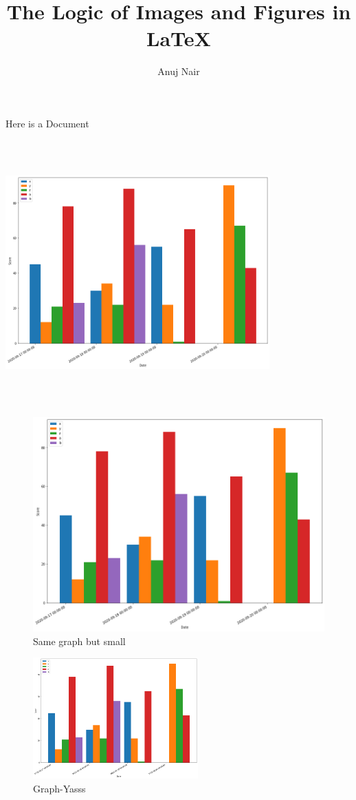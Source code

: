 \documentclass{article}
\author{Anuj Nair}
\title{The Logic of Images and Figures in {\LaTeX}}
\begin{document}
\maketitle

Here is a Document

\begin{center}
\blindtext
\blindtext
\includegraphics[width=4in,height=4in,keepaspectratio]{4_imgMng.png}
\blindtext
\end{center}
\blindtext
\blindtext
\begin{figure}[t]
\centering
\includegraphics[scale=0.2]{4_imgMng.png}
\caption{Same graph but small}
\end{figure}
\blindtext
\blindtext
\begin{figure}
\centering
\includegraphics[width=2.5in]{4_imgMng.png}
\caption{Graph-Yasss\label{graphPic}}
\end{figure}
\end{document}

